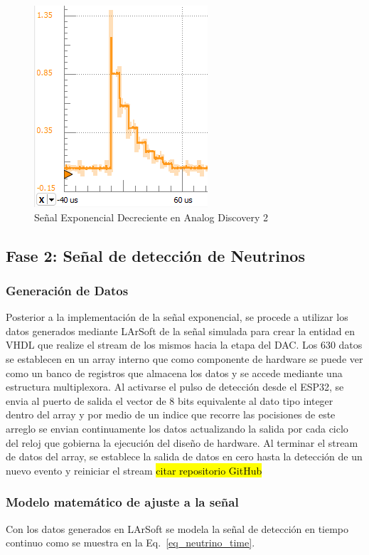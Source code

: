 \documentclass[conference]{IEEEtran}
\begin{document}
\begin{figure}[H]
\centerline{\includegraphics[scale=0.5]{exponencial_signal.png}}
        \caption{Señal Exponencial Decreciente en Analog Discovery 2}
        \label{exponencial_signal}
        \end{figure}


\subsection{Fase 2: Señal de detección de Neutrinos}


\subsubsection{Generación de Datos}
Posterior a la implementación de la señal exponencial, se procede a utilizar los datos generados mediante LArSoft de la señal simulada para crear la entidad en VHDL que realize el stream de los mismos hacia la etapa del DAC. Los 630 datos se establecen en un array interno que como componente de hardware se puede ver como un banco de registros que almacena los datos y se accede mediante una estructura multiplexora. Al activarse el pulso de detección desde el ESP32, se envia al puerto de salida el vector de 8 bits equivalente al dato tipo integer dentro del array y por medio de un indice que recorre las pocisiones de este arreglo se envian continuamente los datos actualizando la salida por cada ciclo del reloj que gobierna la ejecución del diseño de hardware. Al terminar el stream de datos del array, se establece la salida de datos en cero hasta la detección de un nuevo evento y reiniciar el stream \hl{citar repositorio GitHub}


\subsubsection{Modelo matemático de ajuste a la señal}
Con los datos generados en LArSoft se modela la señal de detección en tiempo continuo como se muestra en la Eq.~\ref{eq_neutrino_time}.
\end{document}
